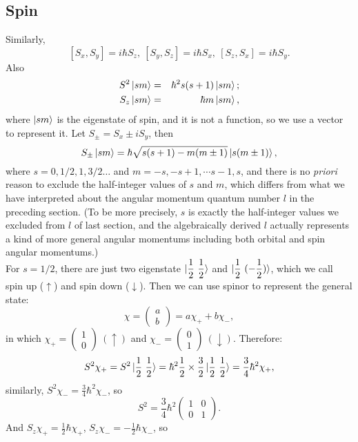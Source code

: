\documentclass[12pt, 
]{article}
\begin{document}
\subsection{Spin}
Similarly, \[
	[S_x,S_y]=i\hbar S_z,~[S_y,S_z]=i\hbar S_x,~[S_z,S_x]=i\hbar S_y.
\]
Also
\begin{eqnarray*}
	S^2\ket{sm}&=&\hbar^2s(s+1)\ket{sm};\\
	S_z\ket{sm}&=&\hbar m\ket{sm},
\end{eqnarray*}
where $\ket{sm}$ is the eigenstate of spin, and it is not a function, so we use a vector to represent it.
Let $S_\pm=S_x\pm iS_y$, then
\begin{equation}
	S_\pm\ket{sm}=\hbar\sqrt{s(s+1)-m(m\pm1)}\ket{s(m\pm1)},
\end{equation}
where $s=0,1/2,1,3/2\dots$ and $m=-s, -s+1,\cdots s-1,s$, and there is no {\it priori} reason to exclude the half-integer values of $s$ and $m$, which differs from what we have interpreted about the angular momentum quantum number $l$ in the preceding section. (To be more precisely, $s$ is exactly the half-integer values we excluded from $l$ of last section, and the algebraically derived $l$ actually represents a kind of more general angular momentums including both orbital and spin angular momentums.)\\
For $s=1/2$, there are just two eigenstate $\displaystyle\ket{\frac{1}{2}~\frac{1}{2}}$ and $\displaystyle\ket{\frac{1}{2}~(-\frac{1}{2})}$, which we call spin up ($\uparrow$) and spin down ($\downarrow$). Then we can use spinor to represent the general state:
\[
	\chi= \begin{pmatrix}
		a\\b
	\end{pmatrix}=a\chi_++b\chi_{-}
,\]
in which $\chi_+= \begin{pmatrix}
	1\\0
\end{pmatrix}~(\uparrow)$ and $\chi_{-}= \begin{pmatrix}
	0\\1
\end{pmatrix}~(\downarrow)$. Therefore:
\[
	S^2\chi_+=S^2\ket{\frac{1}{2}~\frac{1}{2}}=\hbar^2\frac{1}{2}\times\frac{3}{2}\ket{\frac{1}{2}~\frac{1}{2}}=\frac{3}{4}\hbar^2\chi_+
,\]
similarly, $S^2\chi_{-}=\frac{3}{4}\hbar^2\chi_{-}$, so
\[
	S^2=\frac{3}{4}\hbar^2 \begin{pmatrix}
		1&0\\0&1
	\end{pmatrix}.
\]
And $S_z\chi_+=\frac{1}{2}\hbar\chi_+$, $S_z\chi_{-}=-\frac{1}{2}\hbar\chi_{-}$, so
\end{document}
